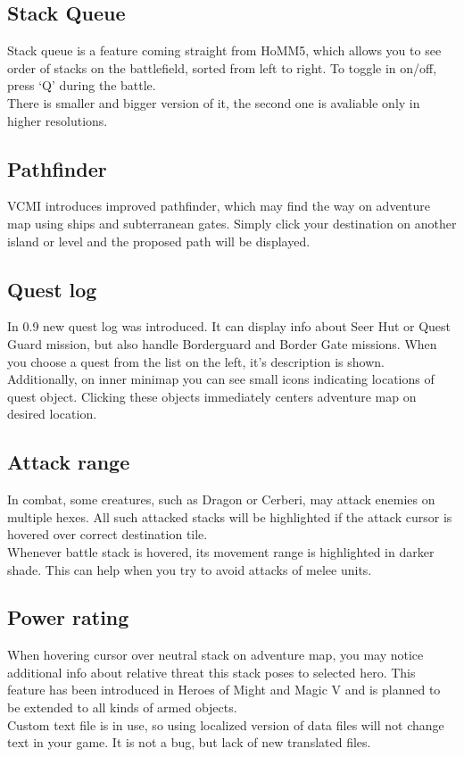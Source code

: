 \documentclass[a4size,final]{article}
\begin{document}
\subsection{Stack Queue}
Stack queue is a feature coming straight from HoMM5, which allows you to see order of stacks on the battlefield, sorted from left to right. To toggle in on/off, press `Q' during the battle.\\
There is smaller and bigger version of it, the second one is avaliable only in higher resolutions.
\subsection{Pathfinder}
VCMI introduces improved pathfinder, which may find the way on adventure map using ships and subterranean gates. Simply click your destination on another island or level and the proposed path will be displayed.
\label{Quest_Log}
\subsection{Quest log}
In 0.9 new quest log was introduced. It can display info about Seer Hut or Quest Guard mission, but also handle Borderguard and Border Gate missions. When you choose a quest from the list on the left, it's description is shown. Additionally, on inner minimap you can see small icons indicating locations of quest object. Clicking these objects immediately centers adventure map on desired location.
\subsection{Attack range}
In combat, some creatures, such as Dragon or Cerberi, may attack enemies on multiple hexes. All such attacked stacks will be highlighted if the attack cursor is hovered over correct destination tile.\\
Whenever battle stack is hovered, its movement range is highlighted in darker shade. This can help when you try to avoid attacks of melee units.
\subsection{Power rating}
When hovering cursor over neutral stack on adventure map, you may notice additional info about relative threat this stack poses to selected hero. This feature has been introduced in Heroes of Might and Magic V and is planned to be extended to all kinds of armed objects.\\
Custom text file is in use, so using localized version of data files will not change text in your game. It is not a bug, but lack of new translated files.
\end{document}
